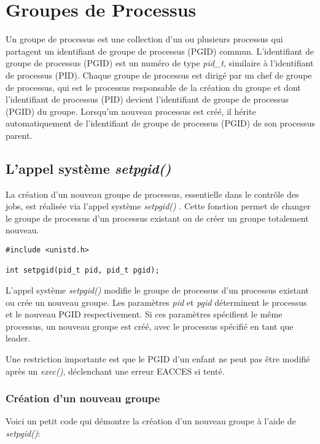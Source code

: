\section{Groupes de Processus}
Un groupe de processus est une collection d’un ou plusieurs processus qui partagent un identifiant de groupe de processus (PGID) commun. L'identifiant de groupe de processus (PGID) est un numéro de type \textit{pid\_t}, similaire à l'identifiant de processus (PID). 
\newline
Chaque groupe de processus est dirigé par un chef de groupe de processus, qui est le processus responsable de la création du groupe et dont l'identifiant de processus (PID) devient l'identifiant de groupe de processus (PGID) du groupe. Lorsqu'un nouveau processus est créé, il hérite automatiquement de l'identifiant de groupe de processus (PGID) de son processus parent.
\newline

\subsection{L’appel système \textit{setpgid()}}

La création d'un nouveau groupe de processus, essentielle dans le contrôle des jobs, est réalisée via l'appel système \textit{setpgid()} . Cette fonction permet de changer le groupe de processus d'un processus existant ou de créer un groupe totalement nouveau.

\begin{lstlisting}
#include <unistd.h>

int setpgid(pid_t pid, pid_t pgid);
\end{lstlisting}

L’appel système \textit{setpgid()} modifie le groupe de processus d'un processus existant ou crée un nouveau groupe. Les paramètres \textit{pid} et \textit{pgid} déterminent le processus et le nouveau PGID respectivement. Si ces paramètres spécifient le même processus, un nouveau groupe est créé, avec le processus spécifié en tant que leader.

Une restriction importante est que le PGID d'un enfant ne peut pas être modifié après un \textit{exec()}, déclenchant une erreur EACCES si tenté.

\subsubsection{Création d'un nouveau groupe}

Voici un petit code qui démontre la création d'un nouveau groupe à l'aide de \textit{setpgid()}:

